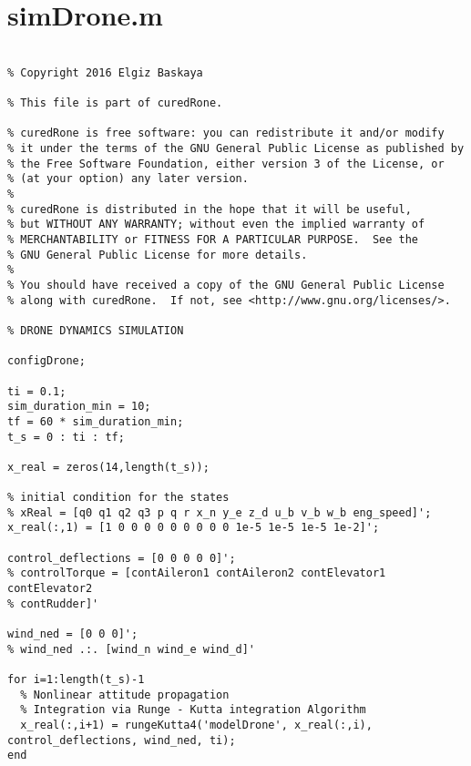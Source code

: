 \clearpage
\newpage

\section{simDrone.m}
\begin{lstlisting}

% Copyright 2016 Elgiz Baskaya

% This file is part of curedRone.

% curedRone is free software: you can redistribute it and/or modify
% it under the terms of the GNU General Public License as published by
% the Free Software Foundation, either version 3 of the License, or
% (at your option) any later version.
% 
% curedRone is distributed in the hope that it will be useful,
% but WITHOUT ANY WARRANTY; without even the implied warranty of
% MERCHANTABILITY or FITNESS FOR A PARTICULAR PURPOSE.  See the
% GNU General Public License for more details.
% 
% You should have received a copy of the GNU General Public License
% along with curedRone.  If not, see <http://www.gnu.org/licenses/>.

% DRONE DYNAMICS SIMULATION

configDrone;

ti = 0.1;
sim_duration_min = 10;
tf = 60 * sim_duration_min;
t_s = 0 : ti : tf;

x_real = zeros(14,length(t_s));

% initial condition for the states
% xReal = [q0 q1 q2 q3 p q r x_n y_e z_d u_b v_b w_b eng_speed]';
x_real(:,1) = [1 0 0 0 0 0 0 0 0 0 1e-5 1e-5 1e-5 1e-2]';

control_deflections = [0 0 0 0 0]';
% controlTorque = [contAileron1 contAileron2 contElevator1 contElevator2
% contRudder]'

wind_ned = [0 0 0]';
% wind_ned .:. [wind_n wind_e wind_d]'

for i=1:length(t_s)-1
  % Nonlinear attitude propagation
  % Integration via Runge - Kutta integration Algorithm
  x_real(:,i+1) = rungeKutta4('modelDrone', x_real(:,i), control_deflections, wind_ned, ti); 
end

 \end{lstlisting}